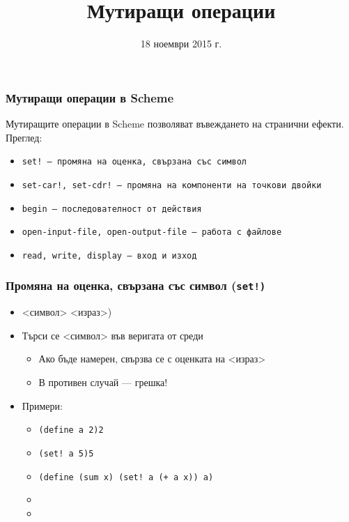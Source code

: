 \documentclass{beamer}
\title{Мутиращи операции}
\date{18 ноември 2015 г.}
\begin{document}
\begin{frame}
  \titlepage
\end{frame}

\begin{frame}
  \frametitle{Мутиращи операции в Scheme}
  Мутиращите операции в Scheme позволяват въвеждането на \alert{странични ефекти}.\\[2em]
  Преглед:
  \begin{itemize}
  \item \tt{set!} --- промяна на оценка, свързана със символ
  \item \tt{set-car!}, \tt{set-cdr!} --- промяна на компоненти на точкови двойки
  \item \tt{begin} --- последователност от действия
  \item \tt{open-input-file}, \tt{open-output-file} --- работа с файлове
  \item \tt{read}, \tt{write}, \tt{display} --- вход и изход
  \end{itemize}
\end{frame}

\begin{frame}[fragile]
  \frametitle{Промяна на оценка, свързана със символ (\tt{set!})}
  \begin{itemize}[<+->]
  \item {}<символ> <израз>\tta)
  \item Търси се <символ> във веригата от среди
    \begin{itemize}
    \item Ако бъде намерен, свързва се с оценката на <израз>
    \item В противен случай --- \alert{грешка!}
    \end{itemize}
  \item Примери:
    \begin{itemize}
    \item \tt{(define a 2)\hspace{5ex}}2
    \item \tt{(set! a 5)\hspace{7ex}}5
    \item \tt{(define (sum x) (set! a (+ a x)) a)}
    \item {}
    \item {}
    \end{itemize}
  \end{itemize}
  \small
  \onslide<+->
\end{frame}
\end{document}
